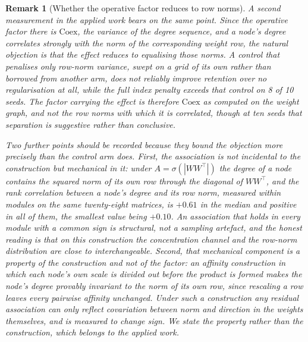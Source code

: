 \documentclass[11pt,a4paper]{article}
\newtheorem{remark}{Remark}
\begin{document}
\begin{remark}[Whether the operative factor reduces to row norms]
A second measurement in the applied work bears on the same point. Since the
operative factor there is $\mathrm{Coex}$, the variance of the degree sequence,
and a node's degree correlates strongly with the norm of the corresponding
weight row, the natural objection is that the effect reduces to equalising
those norms. A control that penalises only row-norm variance, swept on a grid
of its own rather than borrowed from another arm, does not reliably improve
retention over no regularisation at all, while the full index penalty exceeds
that control on 8 of 10 seeds. The factor carrying the effect is therefore
$\mathrm{Coex}$ as computed on the weight graph, and not the row norms with
which it is correlated, though at ten seeds that separation is suggestive
rather than conclusive.

Two further points should be recorded because they bound the objection more
precisely than the control arm does. First, the association is not incidental
to the construction but mechanical in it: under $A = \sigma(|WW^\top|)$ the
degree of a node contains the squared norm of its own row through the
diagonal of $WW^\top$, and the rank correlation between a node's degree and
its row norm, measured within modules on the same twenty-eight matrices, is
$+0.61$ in the median and positive in all of them, the smallest value being
$+0.10$. An association that holds in every module with a common sign is
structural, not a sampling artefact, and the honest reading is that on this
construction the concentration channel and the row-norm distribution are
close to interchangeable. Second, that mechanical component is a property of
the construction and not of the factor: an affinity construction in which
each node's own scale is divided out before the product is formed makes the
node's degree \emph{provably} invariant to the norm of its own row, since
rescaling a row leaves every pairwise affinity unchanged. Under such a
construction any residual association can only reflect covariation between
norm and direction in the weights themselves, and is measured to change sign.
We state the property rather than the construction, which belongs to the
applied work.
\end{remark}
\end{document}
